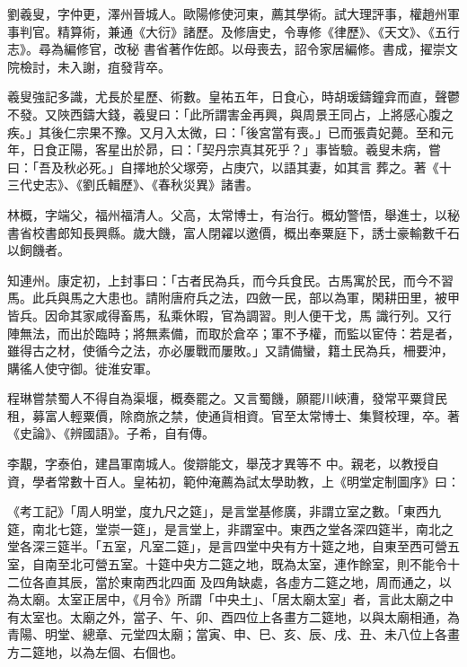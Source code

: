 \begin{pinyinscope}
 劉羲叟，字仲更，澤州晉城人。歐陽修使河東，薦其學術。試大理評事，權趙州軍事判官。精算術，兼通《大衍》諸歷。及修唐史，令專修《律歷》、《天文》、《五行志》。尋為編修官，改秘
 書省著作佐郎。以母喪去，詔令家居編修。書成，擢崇文院檢討，未入謝，疽發背卒。



 羲叟強記多識，尤長於星歷、術數。皇祐五年，日食心，時胡瑗鑄鐘弇而直，聲鬱不發。又陜西鑄大錢，羲叟曰：「此所謂害金再興，與周景王同占，上將感心腹之疾。」其後仁宗果不豫。又月入太微，曰：「後宮當有喪。」已而張貴妃薨。至和元年，日食正陽，客星出於昴，曰：「契丹宗真其死乎？」事皆驗。羲叟未病，嘗曰：「吾及秋必死。」自擇地於父塚旁，占庚穴，以語其妻，如其言
 葬之。著《十三代史志》、《劉氏輯歷》、《春秋災異》諸書。



 林概，字端父，福州福清人。父高，太常博士，有治行。概幼警悟，舉進士，以秘書省校書郎知長興縣。歲大饑，富人閉糴以邀價，概出奉粟庭下，誘士豪輸數千石以飼饑者。



 知連州。康定初，上封事曰：「古者民為兵，而今兵食民。古馬寓於民，而今不習馬。此兵與馬之大患也。請附唐府兵之法，四斂一民，部以為軍，閑耕田里，被甲皆兵。因命其家咸得畜馬，私乘休暇，官為調習。則人便干戈，馬
 識行列。又行陣無法，而出於臨時；將無素備，而取於倉卒；軍不予權，而監以宦侍：若是者，雖得古之材，使循今之法，亦必屢戰而屢敗。」又請備蠻，籍土民為兵，柵要沖，購徭人使守御。徙淮安軍。



 程琳嘗禁蜀人不得自為渠堰，概奏罷之。又言蜀饑，願罷川峽漕，發常平粟貸民租，募富人輕粟價，除商旅之禁，使通貨相資。官至太常博士、集賢校理，卒。著《史論》、《辨國語》。子希，自有傳。



 李覯，字泰伯，建昌軍南城人。俊辯能文，舉茂才異等不
 中。親老，以教授自資，學者常數十百人。皇祐初，範仲淹薦為試太學助教，上《明堂定制圖序》曰：



 《考工記》「周人明堂，度九尺之筵」，是言堂基修廣，非謂立室之數。「東西九筵，南北七筵，堂崇一筵」，是言堂上，非謂室中。東西之堂各深四筵半，南北之堂各深三筵半。「五室，凡室二筵」，是言四堂中央有方十筵之地，自東至西可營五室，自南至北可營五室。十筵中央方二筵之地，既為太室，連作餘室，則不能令十二位各直其辰，當於東南西北四面
 及四角缺處，各虛方二筵之地，周而通之，以為太廟。太室正居中，《月令》所謂「中央土」、「居太廟太室」者，言此太廟之中有太室也。太廟之外，當子、午、卯、酉四位上各畫方二筵地，以與太廟相通，為青陽、明堂、總章、元堂四太廟；當寅、申、巳、亥、辰、戌、丑、未八位上各畫方二筵地，以為左個、右個也。




\end{pinyinscope}

